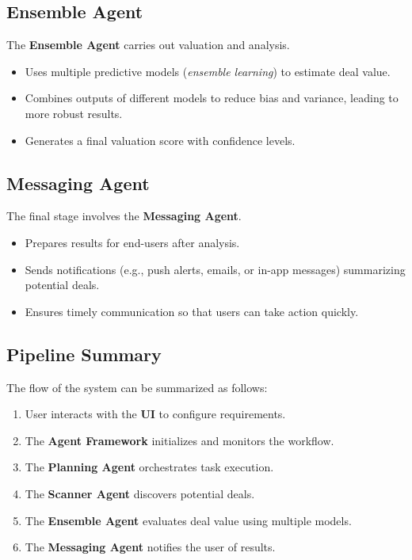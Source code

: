 \documentclass[a4paper, 12pt]{article}
\begin{document}
\subsection*{Ensemble Agent}

The \textbf{Ensemble Agent} carries out valuation and analysis.
\begin{itemize}
    \item Uses multiple predictive models (\emph{ensemble learning}) to estimate deal value.  
    \item Combines outputs of different models to reduce bias and variance, leading to more robust results.  
    \item Generates a final valuation score with confidence levels.  
\end{itemize}

\subsection*{Messaging Agent}

The final stage involves the \textbf{Messaging Agent}.
\begin{itemize}
    \item Prepares results for end-users after analysis.  
    \item Sends notifications (e.g., push alerts, emails, or in-app messages) summarizing potential deals.  
    \item Ensures timely communication so that users can take action quickly.  
\end{itemize}

\subsection*{Pipeline Summary}

The flow of the system can be summarized as follows:
\begin{enumerate}
    \item User interacts with the \textbf{UI} to configure requirements.  
    \item The \textbf{Agent Framework} initializes and monitors the workflow.  
    \item The \textbf{Planning Agent} orchestrates task execution.  
    \item The \textbf{Scanner Agent} discovers potential deals.  
    \item The \textbf{Ensemble Agent} evaluates deal value using multiple models.  
    \item The \textbf{Messaging Agent} notifies the user of results.  
\end{enumerate}
\end{document}

